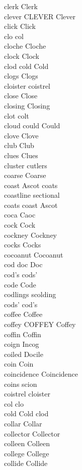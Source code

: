 clerk Clerk\\
clever CLEVER Clever\\
click Click\\
clo col\\
cloche Cloche\\
clock Clock\\
clod cold Cold\\
clogs Clogs\\
cloister coistrel\\
close Close\\
closing Closing\\
clot colt\\
cloud could Could\\
clove Clove\\
club Club\\
clues Clues\\
cluster cutlers\\
coarse Coarse\\
coast Ascot coats\\
coastline sectional\\
coats coast Ascot\\
coca Caoc\\
cock Cock\\
cockney Cockney\\
cocks Cocks\\
cocoanut Cocoanut\\
cod doc Doc\\
cod's cods'\\
code Code\\
codlings scolding\\
cods' cod's\\
coffee Coffee\\
coffey COFFEY Coffey\\
coffin Coffin\\
coign Incog\\
coiled Docile\\
coin Coin\\
coincidence Coincidence\\
coins scion\\
coistrel cloister\\
col clo\\
cold Cold clod\\
collar Collar\\
collector Collector\\
colleen Colleen\\
college College\\
collide Collide\\
